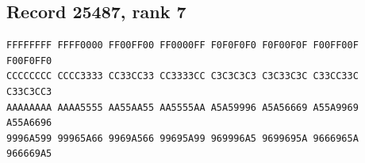 \documentclass[11pt]{amsart}
\theoremstyle{definition}
\theoremstyle{remark}
\numberwithin{equation}{section}
\numberwithin{table}{section}
\begin{document}
\subsection*{Record 25487, rank 7}
\begin{Verbatim}[fontsize=\scriptsize,xleftmargin=1em]
FFFFFFFF FFFF0000 FF00FF00 FF0000FF F0F0F0F0 F0F00F0F F00FF00F F00F0FF0
CCCCCCCC CCCC3333 CC33CC33 CC3333CC C3C3C3C3 C3C33C3C C33CC33C C33C3CC3
AAAAAAAA AAAA5555 AA55AA55 AA5555AA A5A59996 A5A56669 A55A9969 A55A6696
9996A599 99965A66 9969A566 99695A99 969996A5 9699695A 9666965A 966669A5
\end{Verbatim}
\par
{}\par
\end{document}
